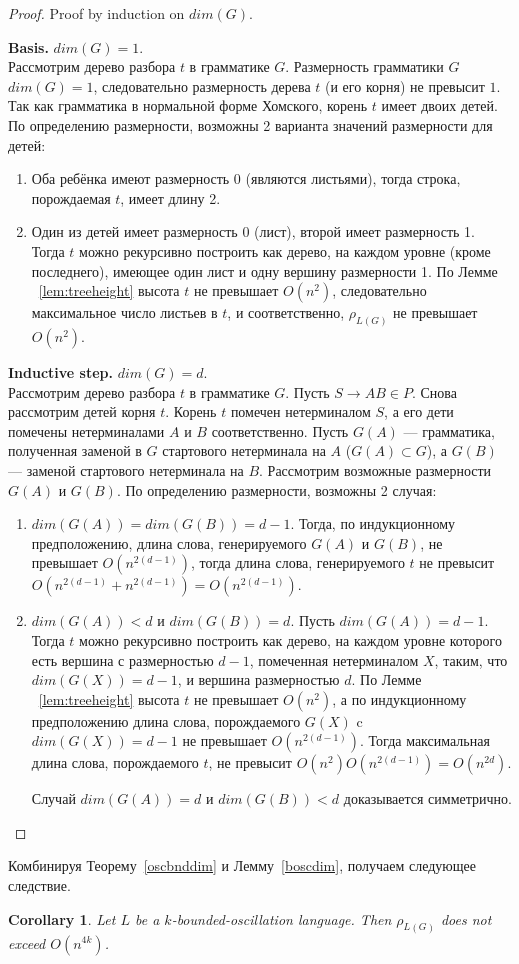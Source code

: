 \documentclass[11pt,a4paper]{article} %
\newtheorem{corollary}{Corollary}
\begin{document}
\begin{proof}
Proof by induction on $dim(G)$.

\textbf{Basis.} $dim(G) = 1$.
\\
Рассмотрим дерево разбора $t$ в грамматике $G$. Размерность грамматики $G$ $dim(G) = 1$, следовательно размерность дерева $t$ (и его корня) не превысит $1$. Так как грамматика в нормальной форме Хомского, корень $t$ имеет двоих детей. По определению размерности, возможны 2 варианта значений размерности для детей:
\begin{enumerate}
\item Оба ребёнка имеют размерность 0 (являются листьями), тогда строка, порождаемая $t$, имеет длину 2.
\item Один из детей имеет размерность 0 (лист), второй имеет размерность 1. Тогда $t$ можно рекурсивно построить как дерево, на каждом уровне (кроме последнего), имеющее один лист и одну вершину размерности 1.  По Лемме ~\ref{lem:treeheight} высота $t$ не превышает $O(n^2)$, следовательно максимальное число листьев в $t$, и соответственно, $\rho_{L(G)}$ не превышает $O(n^2)$. 
\end{enumerate}
\textbf{Inductive step.} $dim(G) = d$.
\\
Рассмотрим дерево разбора $t$ в грамматике $G$. Пусть $S \rightarrow AB \in P$. Снова рассмотрим детей корня $t$. Корень $t$ помечен нетерминалом $S$, а его дети помечены нетерминалами $A$ и $B$ соответственно. Пусть $G(A)$ --- грамматика, полученная заменой в $G$ стартового нетерминала на $A$ ($G(A) \subset G$), а $G(B)$ --- заменой стартового нетерминала на $B$.  Рассмотрим возможные размерности $G(A)$ и $G(B)$. По определению размерности, возможны 2 случая:
\begin{enumerate}
\item $dim(G(A)) = dim(G(B)) = d-1$. Тогда, по индукционному предположению, длина слова, генерируемого $G(A)$ и $G(B)$, не превышает $O(n^{2(d-1)})$, тогда длина слова, генерируемого $t$ не превысит $O(n^{2(d-1)} + n^{2(d-1)}) = O(n^{2(d-1)})$.
\item $dim(G(A)) < d$ и $dim(G(B)) = d$. Пусть $dim(G(A)) = d - 1$. Тогда $t$ можно рекурсивно построить как дерево, на каждом уровне которого есть вершина с размерностью $d-1$, помеченная нетерминалом $X$, таким, что $dim(G(X)) = d - 1$, и вершина размерностью $d$. По Лемме ~\ref{lem:treeheight} высота $t$ не превышает $O(n^2)$, а по индукционному предположению длина слова, порождаемого $G(X)$ c $dim(G(X)) = d - 1$ не превышает $O(n^{2(d-1)})$. Тогда максимальная длина слова, порождаемого $t$, не превысит $O(n^2)O(n^{2(d-1)}) = O(n^{2d})$.

Случай $dim(G(A)) = d$ и $dim(G(B)) < d$ доказывается симметрично.
\end{enumerate}
\end{proof}
Комбинируя Теорему~\ref{oscbnddim} и Лемму~\ref{boscdim}, получаем следующее следствие.
\begin{corollary}
Let $L$ be a $k$-bounded-oscillation language. Then $\rho_{L(G)}$ does not exceed $O(n^{4k})$.
\end{corollary}
\end{document}
